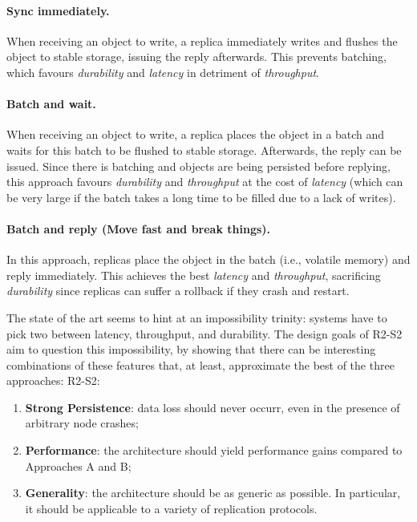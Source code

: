 \paragraph{Sync immediately.} When receiving an object to write, a
replica immediately writes and flushes the object to stable
storage, issuing the reply afterwards. This prevents batching,
which favours \emph{durability} and \emph{latency} in detriment
of \emph{throughput}.

\paragraph{Batch and wait.} When receiving an object to write, a
replica places the object in a batch and waits for this batch to
be flushed to stable storage. Afterwards, the reply can be
issued. Since there is batching and objects are being persisted
before replying, this approach favours \emph{durability} and
\emph{throughput} at the cost of \emph{latency} (which can be
very large if the batch takes a long time to be filled due to a
lack of writes).

\paragraph{Batch and reply (Move fast and break things).} In this approach,
replicas place the object in the batch (i.e., volatile memory)
and reply immediately. This achieves the best \emph{latency} and
\emph{throughput}, sacrificing \emph{durability} since replicas
can suffer a rollback if they crash and restart.

The state of the art seems to hint at
an impossibility trinity: systems have to pick two between latency,
throughput, and durability. The design goals of \ac{R2-S2} aim to question this
impossibility, by showing that there can be interesting
combinations of these features that, at least, approximate the
best of the three approaches:
\ac{R2-S2}:
\begin{enumerate}
    \item \textbf{Strong Persistence}: data loss should never
        occurr, even in the presence of arbitrary node crashes;

    \item \textbf{Performance}: the architecture should yield
        performance gains compared to
        Approaches A and B\@;
    \item \textbf{Generality}: the architecture should be as
        generic as possible. In particular, it should be
        applicable to a variety of replication protocols.
\fi
\end{enumerate}

